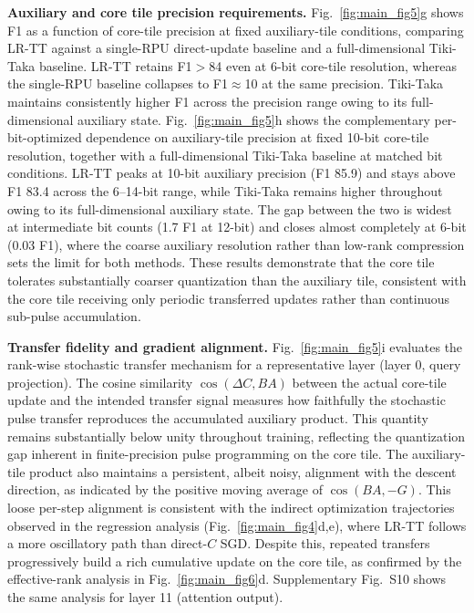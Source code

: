 \documentclass[fleqn,10pt]{wlscirep}
\begin{document}
\noindent
\textbf{Auxiliary and core tile precision requirements.}
Fig.~\ref{fig:main_fig5}g shows F1 as a function of core-tile precision at fixed auxiliary-tile conditions, comparing LR-TT against a single-RPU direct-update baseline and a full-dimensional Tiki-Taka baseline. LR-TT retains F1\(>\)84 even at 6-bit core-tile resolution, whereas the single-RPU baseline collapses to F1\(\approx\)10 at the same precision. Tiki-Taka maintains consistently higher F1 across the precision range owing to its full-dimensional auxiliary state. Fig.~\ref{fig:main_fig5}h shows the complementary per-bit-optimized dependence on auxiliary-tile precision at fixed 10-bit core-tile resolution, together with a full-dimensional Tiki-Taka baseline at matched bit conditions. LR-TT peaks at 10-bit auxiliary precision (F1 85.9) and stays above F1 83.4 across the 6--14-bit range, while Tiki-Taka remains higher throughout owing to its full-dimensional auxiliary state. The gap between the two is widest at intermediate bit counts (1.7 F1 at 12-bit) and closes almost completely at 6-bit (0.03 F1), where the coarse auxiliary resolution rather than low-rank compression sets the limit for both methods. These results demonstrate that the core tile tolerates substantially coarser quantization than the auxiliary tile, consistent with the core tile receiving only periodic transferred updates rather than continuous sub-pulse accumulation.

\noindent
\textbf{Transfer fidelity and gradient alignment.}
Fig.~\ref{fig:main_fig5}i evaluates the rank-wise stochastic transfer mechanism for a representative layer (layer 0, query projection). The cosine similarity \(\cos(\Delta C, 
BA)\) between the actual core-tile update and the intended transfer signal measures how faithfully the stochastic pulse transfer reproduces the accumulated auxiliary product. This quantity remains substantially below unity throughout training, reflecting the quantization gap inherent in finite-precision pulse programming on the core tile. The auxiliary-tile product also maintains a persistent, albeit noisy, alignment with the descent direction, as indicated by the positive moving average of \(\cos(BA, -G)\). This loose per-step alignment is consistent with the indirect optimization trajectories observed in the regression analysis (Fig.~\ref{fig:main_fig4}d,e), where LR-TT follows a more oscillatory path than direct-\(C\) SGD. Despite this, repeated transfers progressively build a rich cumulative update on the core tile, as confirmed by the effective-rank analysis in Fig.~\ref{fig:main_fig6}d. Supplementary Fig.~S10 shows the same analysis for layer 11 (attention output).
\end{document}
